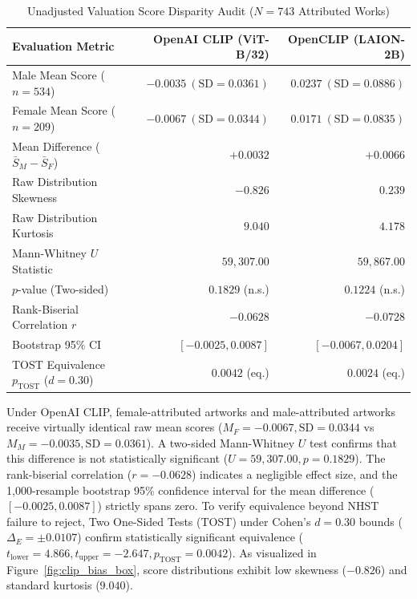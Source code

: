 \documentclass[pdflatex,sn-mathphys-num]{sn-jnl}%
\theoremstyle{thmstyleone}%
\theoremstyle{thmstyletwo}%
\theoremstyle{thmstylethree}%
\begin{document}
\begin{table}[h]
\caption{Unadjusted Valuation Score Disparity Audit ($N=743$ Attributed Works)}
\label{tab:unadjusted_results}
\centering
\small
\begin{tabular}{lrr}
\toprule
\textbf{Evaluation Metric} & \textbf{OpenAI CLIP (ViT-B/32)} & \textbf{OpenCLIP (LAION-2B)} \\
\midrule
Male Mean Score ($n=534$) & $-0.0035 \ (\text{SD} = 0.0361)$ & $0.0237 \ (\text{SD} = 0.0886)$ \\
Female Mean Score ($n=209$) & $-0.0067 \ (\text{SD} = 0.0344)$ & $0.0171 \ (\text{SD} = 0.0835)$ \\
Mean Difference ($\bar{S}_M - \bar{S}_F$) & $+0.0032$ & $+0.0066$ \\
Raw Distribution Skewness & $-0.826$ & $0.239$ \\
Raw Distribution Kurtosis & $9.040$ & $4.178$ \\
\midrule
Mann-Whitney $U$ Statistic & $59,307.00$ & $59,867.00$ \\
$p$-value (Two-sided) & $0.1829$ (n.s.) & $0.1224$ (n.s.) \\
Rank-Biserial Correlation $r$ & $-0.0628$ & $-0.0728$ \\
Bootstrap 95\% CI & $[-0.0025, 0.0087]$ & $[-0.0067, 0.0204]$ \\
TOST Equivalence $p_{\text{TOST}}$ ($d=0.30$) & $0.0042$ (eq.) & $0.0024$ (eq.) \\
\bottomrule
\end{tabular}
\end{table}

Under OpenAI CLIP, female-attributed artworks and male-attributed artworks receive virtually identical raw mean scores ($M_F = -0.0067, \text{SD} = 0.0344$ vs $M_M = -0.0035, \text{SD} = 0.0361$). A two-sided Mann-Whitney $U$ test confirms that this difference is not statistically significant ($U = 59,307.00, p = 0.1829$). The rank-biserial correlation ($r = -0.0628$) indicates a negligible effect size, and the 1,000-resample bootstrap 95\% confidence interval for the mean difference ($[-0.0025, 0.0087]$) strictly spans zero. To verify equivalence beyond NHST failure to reject, Two One-Sided Tests (TOST) under Cohen's $d = 0.30$ bounds ($\Delta_E = \pm 0.0107$) confirm statistically significant equivalence ($t_{\text{lower}} = 4.866, t_{\text{upper}} = -2.647, p_{\text{TOST}} = 0.0042$). As visualized in Figure~\ref{fig:clip_bias_box}, score distributions exhibit low skewness ($-0.826$) and standard kurtosis ($9.040$).
\end{document}
